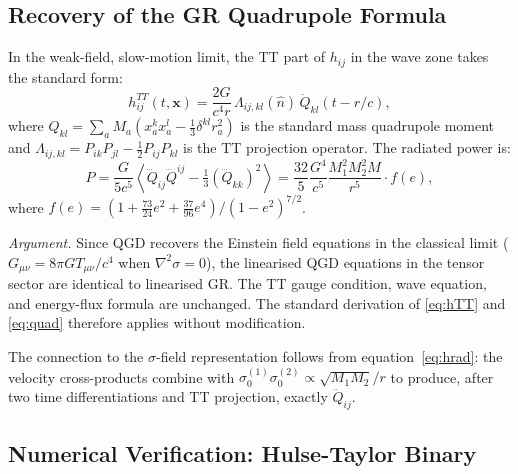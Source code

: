 \documentclass[12pt,a4paper]{article}
\begin{document}
\subsection{Recovery of the GR Quadrupole Formula}

\begin{theorem}
In the weak-field, slow-motion limit, the TT part of $h_{ij}$ in the
wave zone takes the standard form:
\begin{equation}
  h_{ij}^{TT}(t,\mathbf{x})
    = \frac{2G}{c^4 r}\,\Lambda_{ij,kl}(\hat{n})\,\ddot{Q}_{kl}(t-r/c),
  \label{eq:hTT}
\end{equation}
where $Q_{kl} = \sum_a M_a(x_a^k x_a^l - \frac{1}{3}\delta^{kl}r_a^2)$
is the standard mass quadrupole moment and
$\Lambda_{ij,kl} = P_{ik}P_{jl} - \frac{1}{2}P_{ij}P_{kl}$
is the TT projection operator.
The radiated power is:
\begin{equation}
  \boxed{P = \frac{G}{5c^5}
    \left\langle\dddot{Q}_{ij}\dddot{Q}^{ij}
    - \tfrac{1}{3}(\dddot{Q}_{kk})^2\right\rangle
  = \frac{32}{5}\frac{G^4}{c^5}\frac{M_1^2 M_2^2 M}{r^5}\cdot f(e),}
  \label{eq:quad}
\end{equation}
where $f(e) = (1 + \tfrac{73}{24}e^2 + \tfrac{37}{96}e^4)/(1-e^2)^{7/2}$.
\end{theorem}

\noindent\textit{Argument.}
Since QGD recovers the Einstein field equations in the classical limit
($G_{\mu\nu} = 8\pi G T_{\mu\nu}/c^4$ when $\nabla^2\sigma = 0$),
the linearised QGD equations in the tensor sector are identical to
linearised GR. The TT gauge condition, wave equation, and energy-flux
formula are unchanged. The standard derivation of \eqref{eq:hTT} and
\eqref{eq:quad} therefore applies without modification.

The connection to the $\sigma$-field representation follows from
equation~\eqref{eq:hrad}: the velocity cross-products combine with
$\sigma_0^{(1)}\sigma_0^{(2)} \propto \sqrt{M_1M_2}/r$ to produce,
after two time differentiations and TT projection, exactly $\ddot{Q}_{ij}$.

\subsection{Numerical Verification: Hulse-Taylor Binary}
\end{document}

